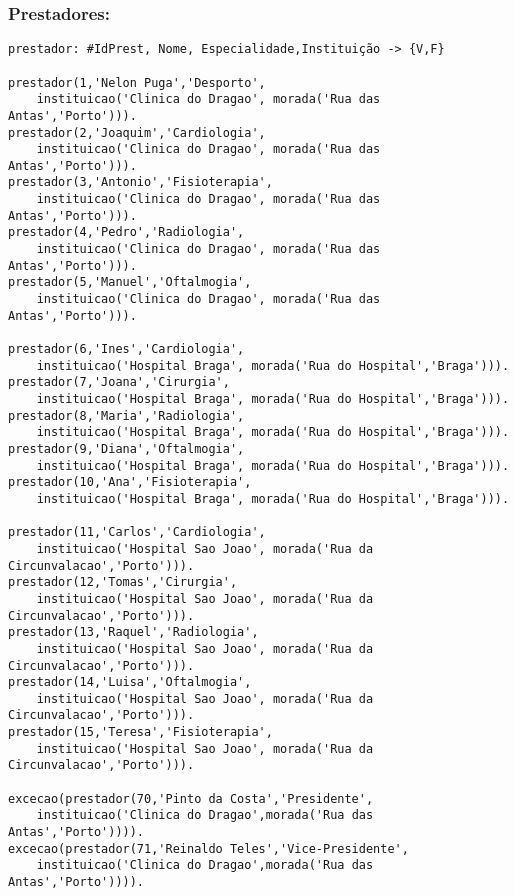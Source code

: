 \documentclass{report}
\begin{document}
\subsubsection{Prestadores:}
\begin{verbatim}
prestador: #IdPrest, Nome, Especialidade,Instituição -> {V,F}

prestador(1,'Nelon Puga','Desporto',
    instituicao('Clinica do Dragao', morada('Rua das Antas','Porto'))).
prestador(2,'Joaquim','Cardiologia',
    instituicao('Clinica do Dragao', morada('Rua das Antas','Porto'))).
prestador(3,'Antonio','Fisioterapia',
    instituicao('Clinica do Dragao', morada('Rua das Antas','Porto'))).
prestador(4,'Pedro','Radiologia',
    instituicao('Clinica do Dragao', morada('Rua das Antas','Porto'))).
prestador(5,'Manuel','Oftalmogia',
    instituicao('Clinica do Dragao', morada('Rua das Antas','Porto'))).

prestador(6,'Ines','Cardiologia',
    instituicao('Hospital Braga', morada('Rua do Hospital','Braga'))).
prestador(7,'Joana','Cirurgia',
    instituicao('Hospital Braga', morada('Rua do Hospital','Braga'))).
prestador(8,'Maria','Radiologia',
    instituicao('Hospital Braga', morada('Rua do Hospital','Braga'))).
prestador(9,'Diana','Oftalmogia',
    instituicao('Hospital Braga', morada('Rua do Hospital','Braga'))).
prestador(10,'Ana','Fisioterapia',
    instituicao('Hospital Braga', morada('Rua do Hospital','Braga'))).

prestador(11,'Carlos','Cardiologia',
    instituicao('Hospital Sao Joao', morada('Rua da Circunvalacao','Porto'))).
prestador(12,'Tomas','Cirurgia',
    instituicao('Hospital Sao Joao', morada('Rua da Circunvalacao','Porto'))).
prestador(13,'Raquel','Radiologia',
    instituicao('Hospital Sao Joao', morada('Rua da Circunvalacao','Porto'))).
prestador(14,'Luisa','Oftalmogia',
    instituicao('Hospital Sao Joao', morada('Rua da Circunvalacao','Porto'))).
prestador(15,'Teresa','Fisioterapia',
    instituicao('Hospital Sao Joao', morada('Rua da Circunvalacao','Porto'))).

excecao(prestador(70,'Pinto da Costa','Presidente', 
    instituicao('Clinica do Dragao',morada('Rua das Antas','Porto')))).
excecao(prestador(71,'Reinaldo Teles','Vice-Presidente', 
    instituicao('Clinica do Dragao',morada('Rua das Antas','Porto')))).
\end{verbatim}
\end{document}
